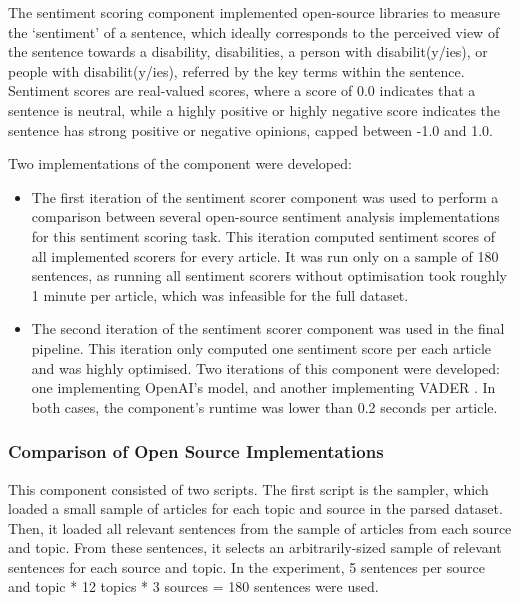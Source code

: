 \documentclass{report}
\newcommand{\textapprox}{\raisebox{0.5ex}{\texttildelow}}  %
\begin{document}
The sentiment scoring component implemented open-source libraries to measure the `sentiment' of a sentence, which ideally corresponds to the perceived view of the sentence towards a disability, disabilities, a person with disabilit(y/ies), or people with disabilit(y/ies), referred by the key terms within the sentence.
Sentiment scores are real-valued scores, where a score of 0.0 indicates that a sentence is neutral, while a highly positive or highly negative score indicates the sentence has strong positive or negative opinions, capped between -1.0 and 1.0.

Two implementations of the component were developed: 
\begin{itemize}
	\item The first iteration of the sentiment scorer component was used to perform a comparison between several open-source sentiment analysis implementations for this sentiment scoring task.
		This iteration computed sentiment scores of all implemented scorers for every article. 
		It was run only on a sample of 180 sentences, as running all sentiment scorers without optimisation took roughly \textapprox1 minute per article, which was infeasible for the full dataset.
	\item The second iteration of the sentiment scorer component was used in the final pipeline.
		This iteration only computed one sentiment score per each article and was highly optimised.
		Two iterations of this component were developed: one implementing OpenAI's \cite{OpenAI} model, and another implementing VADER \cite{VADER}.
		In both cases, the component's runtime was lower than 0.2 seconds per article.
\end{itemize}

\subsubsection{Comparison of Open Source Implementations} \label{des-sentiment-comparison}

This component consisted of two scripts.
The first script is the sampler, which loaded a small sample of articles for each topic and source in the parsed dataset.
Then, it loaded all relevant sentences from the sample of articles from each source and topic.
From these sentences, it selects an arbitrarily-sized sample of relevant sentences for each source and topic.
In the experiment, 5 sentences per source and topic * 12 topics * 3 sources = 180 sentences were used.
\end{document}
